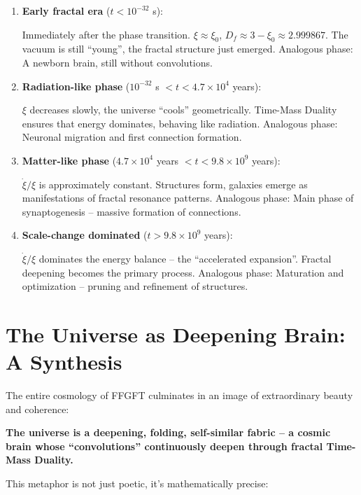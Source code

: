 \documentclass[12pt,a4paper]{article}
\begin{document}
\begin{enumerate}[leftmargin=*]
\item \textbf{Early fractal era} ($t < 10^{-32}$ s): 

Immediately after the phase transition. $\xi \approx \xi_0$, $D_f \approx 3 - \xi_0 \approx 2.999867$. The vacuum is still ``young'', the fractal structure just emerged. Analogous phase: A newborn brain, still without convolutions.

\item \textbf{Radiation-like phase} ($10^{-32}$ s $ < t < 4.7 \times 10^4$ years):

$\xi$ decreases slowly, the universe ``cools'' geometrically. Time-Mass Duality ensures that energy dominates, behaving like radiation. Analogous phase: Neuronal migration and first connection formation.

\item \textbf{Matter-like phase} ($4.7 \times 10^4$ years $ < t < 9.8 \times 10^9$ years):

$\dot{\xi}/\xi$ is approximately constant. Structures form, galaxies emerge as manifestations of fractal resonance patterns. Analogous phase: Main phase of synaptogenesis -- massive formation of connections.

\item \textbf{Scale-change dominated} ($t > 9.8 \times 10^9$ years):

$\dot{\xi}/\xi$ dominates the energy balance -- the ``accelerated expansion''. Fractal deepening becomes the primary process. Analogous phase: Maturation and optimization -- pruning and refinement of structures.
\end{enumerate}

\section{The Universe as Deepening Brain: A Synthesis}

The entire cosmology of FFGFT culminates in an image of extraordinary beauty and coherence:

\textbf{The universe is a deepening, folding, self-similar fabric -- a cosmic brain whose ``convolutions'' continuously deepen through fractal Time-Mass Duality.}

This metaphor is not just poetic, it's mathematically precise:
\end{document}
